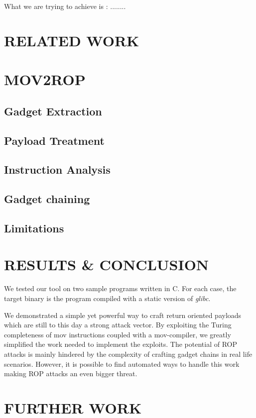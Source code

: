 \documentclass[10pt,twocolumn]{article}
\begin{document}
What we are trying to achieve is : ........
\section{RELATED WORK}
\lipsum[1]

\section{MOV2ROP}
\lipsum[1]
\subsection{Gadget Extraction}
\lipsum[1]
\subsection{Payload Treatment}
\lipsum[1]
\subsection{Instruction Analysis}
\lipsum[1]
\subsection{Gadget chaining}
\lipsum[1]
\subsection{Limitations}
\lipsum[1]

  
\section{RESULTS \& CONCLUSION}
  We tested our tool on two sample programs written in C. For each case, the
  target binary is the program compiled with a static version of \textit{glibc}.

  We demonstrated a simple yet powerful way to craft return oriented payloads
  which are still to this day a strong attack vector. By exploiting the Turing
  completeness of mov instructions coupled with a mov-compiler, we greatly
  simplified the work needed to implement the exploits. The potential of ROP
  attacks is mainly hindered by the complexity of crafting gadget chains in real
  life scenarios. However, it is possible to find automated ways to handle this
  work making ROP attacks an even bigger threat.

\section{FURTHER WORK}
\lipsum[1]
\end{document}
